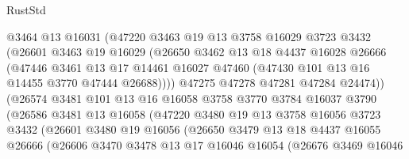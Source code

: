 \begin{lexlean}{RustStd}
\begin{coremodule}
                      @3464
                      @13
                      @16031
                      (@47220
                        @3463
                        @19
                        @13
                        @3758
                        @16029
                        @3723
                        @3432
                        (@26601
                          @3463
                          @19
                          @16029
                          (@26650
                            @3462
                            @13
                            @18
                            @4437
                            @16028
                            @26666
                            (@47446
                              @3461
                              @13
                              @17
                              @14461
                              @16027
                              @47460
                              (@47430 @101 @13 @16 @14455 @3770 @47444 @26688))))
                        @47275
                        @47278
                        @47281
                        @47284
                        @24474))
                    (@26574
                      @3481
                      @101
                      @13
                      @16
                      @16058
                      @3758
                      @3770
                      @3784
                      @16037
                      @3790
                      (@26586
                        @3481
                        @13
                        @16058
                        (@47220
                          @3480
                          @19
                          @13
                          @3758
                          @16056
                          @3723
                          @3432
                          (@26601
                            @3480
                            @19
                            @16056
                            (@26650
                              @3479
                              @13
                              @18
                              @4437
                              @16055
                              @26666
                              (@26606
                                @3470
                                @3478
                                @13
                                @17
                                @16046
                                @16054
                                (@26676
                                  @3469
                                  @16046

\end{coremodule}
\end{lexlean}
